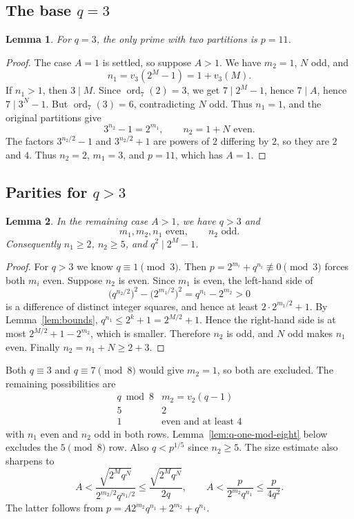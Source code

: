 \documentclass[11pt]{article}
\newtheorem{lemma}{Lemma}
\begin{document}
\subsection{\texorpdfstring{The base $q=3$}{The base q=3}}

\begin{lemma}\label{lem:qthree}
For $q=3$, the only prime with two partitions is $p=11$.
\end{lemma}
\begin{proof}
The case $A=1$ is settled, so suppose $A>1$.
We have $m_2=1$, $N$ odd, and
\[
n_1=v_3(2^M-1)=1+v_3(M).
\]
If $n_1>1$, then $3\mid M$. Since $\operatorname{ord}_7(2)=3$,
we get $7\mid2^M-1$, hence $7\mid A$, hence $7\mid3^N-1$.
But $\operatorname{ord}_7(3)=6$, contradicting $N$ odd.
Thus $n_1=1$, and the original partitions give
\[
3^{n_2}-1=2^{m_1},\qquad n_2=1+N\text{ even}.
\]
The factors $3^{n_2/2}-1$ and $3^{n_2/2}+1$ are powers of $2$
differing by $2$, so they are $2$ and $4$. Thus $n_2=2$, $m_1=3$,
and $p=11$, which has $A=1$.
\end{proof}

\subsection{\texorpdfstring{Parities for $q>3$}{Parities for q>3}}

\begin{lemma}\label{lem:new-parities}
In the remaining case $A>1$, we have $q>3$ and
\[
m_1,m_2,n_1\text{ even},\qquad n_2\text{ odd}.
\]
Consequently $n_1\geq2$, $n_2\geq5$, and $q^2\mid2^M-1$.
\end{lemma}
\begin{proof}
For $q>3$ we know $q\equiv1\pmod3$. Then
$p=2^{m_i}+q^{n_i}\not\equiv0\pmod3$ forces both $m_i$ even.
Suppose $n_2$ is even. Since $m_1$ is even, the left-hand side of
\[
\bigl(q^{n_2/2}\bigr)^2-\bigl(2^{m_1/2}\bigr)^2
=q^{n_1}-2^{m_2}>0
\]
is a difference of distinct integer squares, and hence at least
$2\cdot2^{m_1/2}+1$. By Lemma~\ref{lem:bounds},
$q^{n_1}\leq2^k+1=2^{M/2}+1$. Hence the right-hand side is at most
$2^{M/2}+1-2^{m_2}$, which is smaller. Therefore $n_2$ is odd,
and $N$ odd makes $n_1$ even. Finally $n_2=n_1+N\geq2+3$.
\end{proof}

Both $q\equiv3$ and $q\equiv7\pmod8$ would give $m_2=1$, so both
are excluded. The remaining possibilities are
\[
\begin{array}{c|c}
q\bmod8&m_2=v_2(q-1)\\ \hline
5&2\\
1&\text{even and at least }4
\end{array}
\]
with $n_1$ even and $n_2$ odd in both rows.
Lemma~\ref{lem:q-one-mod-eight} below excludes the $5\pmod8$ row.
Also $q<p^{1/5}$ since $n_2\geq5$.
The size estimate also sharpens to
\begin{equation}\label{eq:sharp-A}
A<\frac{\sqrt{2^M q^N}}{2^{m_2/2}q^{n_1/2}}
\leq\frac{\sqrt{2^M q^N}}{2q},\qquad
A<\frac{p}{2^{m_2}q^{n_1}}\leq\frac{p}{4q^2}.
\end{equation}
The latter follows from $p=A2^{m_2}q^{n_1}+2^{m_2}+q^{n_1}$.
\end{document}
